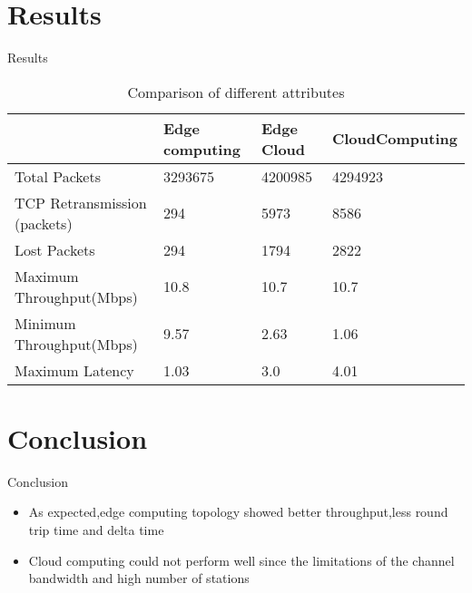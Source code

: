 \documentclass{beamer}
\begin{document}
\section{Results}
\begin{frame}{Results}
\begin{table}[h!]
\begin{center}
\caption{Comparison of different attributes}
\label{tab:table1}
\begin{tabular}{ |p{2.9cm}|p{2.5cm}|p{2cm}|p{2.5cm}|  }
 \hline
  & Edge \newline computing & Edge \newline Cloud & Cloud\newline Computing\\ 
 \hline
 Total Packets & 3293675 & 4200985 & 4294923\\
 \hline
 TCP \newline Retransmission \newline(packets)  & 294 & 5973 &8586\\
 \hline
 Lost Packets & 294 & 1794 & 2822 \\ 
 \hline
 Maximum \newline Throughput(Mbps) & 10.8 & 10.7 & 10.7\\
 \hline 
 Minimum \newline Throughput(Mbps) & 9.57 & 2.63 & 1.06 \\
 \hline
 Maximum \newline Latency & 1.03 & 3.0 &4.01 \\
 \hline
\end{tabular}
\end{center}
\end{table}

\end{frame}


\section{Conclusion}

\begin{frame}{Conclusion}
\begin{itemize}
	\item As expected,edge computing topology showed better throughput,less round trip time and delta time
	\item Cloud computing could not perform well since the limitations of the channel bandwidth and high number of stations
\end{itemize}
\end{frame}
\end{document}
